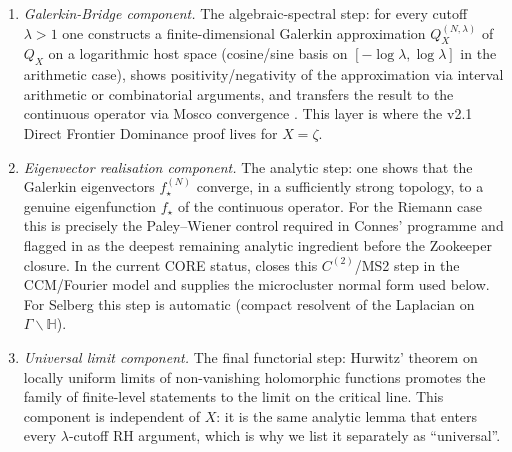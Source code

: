 \documentclass[11pt]{article}
\theoremstyle{definition}
\theoremstyle{remark}
\begin{document}
\begin{enumerate}
\item[\textbf{(GBC)}] \emph{Galerkin-Bridge component.} The
algebraic-spectral step: for every cutoff $\lambda > 1$ one
constructs a finite-dimensional Galerkin approximation $Q_X^{(N,\lambda)}$
of $Q_X$ on a logarithmic host space (cosine/sine basis on
$[-\log\lambda,\log\lambda]$ in the arithmetic case), shows
positivity/negativity of the approximation via interval arithmetic
or combinatorial arguments, and transfers the result to the
continuous operator via Mosco convergence
\cite{MetaGalerkinBridge,ConnesConsaniMoscovici2025}. This layer is where the
v2.1 Direct Frontier Dominance proof \cite{Geiger2026RHII} lives
for $X = \zeta$.

\item[$\boldsymbol{C^{(2)}}$] \emph{Eigenvector realisation
component.} The analytic step: one shows that the Galerkin
eigenvectors $f_\star^{(N)}$ converge, in a sufficiently strong
topology, to a genuine eigenfunction $f_\star$ of the continuous
operator. For the Riemann case this is precisely the Paley--Wiener
control required in Connes' programme
\cite{Connes2026,ConnesConsaniMoscovici2025} and flagged in \cite{Geiger2026RHII}
as the deepest remaining analytic ingredient before the Zookeeper
closure.  In the current CORE status, \cite{Zookeeper2026} closes this
$C^{(2)}$/MS2 step in the CCM/Fourier model and supplies the
microcluster normal form used below.  For Selberg this step is
automatic (compact resolvent of the Laplacian on
$\Gamma\backslash\mathbb{H}$).

\item[\textbf{(Hurwitz)}] \emph{Universal limit component.} The
final functorial step: Hurwitz' theorem on locally uniform limits
of non-vanishing holomorphic functions promotes the family of
finite-level statements to the limit on the critical line. This
component is independent of $X$: it is the same analytic lemma
that enters every $\lambda$-cutoff RH argument, which is why we
list it separately as ``universal''.
\end{enumerate}
\end{document}
